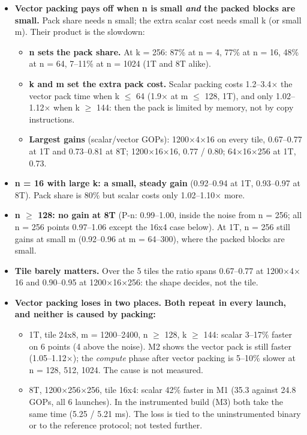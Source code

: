 \documentclass[10pt,a4paper]{article}
\begin{document}
\begin{itemize}\setlength\itemsep{2pt}
\item \textbf{Vector packing pays off when n is small \emph{and} the packed blocks are small.} Pack share needs n small;
the extra scalar cost needs small k (or small m). Their product is the slowdown:
  \begin{itemize}\setlength\itemsep{1pt}
  \item \textbf{n sets the pack share.} At k = 256: 87\% at n = 4, 77\% at n = 16, 48\% at n = 64, 7--11\% at n = 1024 (1T and 8T alike).
  \item \textbf{k and m set the extra pack cost.} Scalar packing costs 1.2--3.4$\times$ the vector pack time when k $\le$ 64
  (1.9$\times$ at m $\le$ 128, 1T), and only 1.02--1.12$\times$ when k $\ge$ 144: then the pack is limited by memory, not by
  copy instructions.
  \item \textbf{Largest gains} (scalar/vector GOPs): 1200$\times$4$\times$16 on every tile, 0.67--0.77 at 1T and 0.73--0.81 at 8T;
  1200$\times$16$\times$16, 0.77 / 0.80; 64$\times$16$\times$256 at 1T, 0.73.
  \end{itemize}
\item \textbf{n = 16 with large k: a small, steady gain} (0.92--0.94 at 1T, 0.93--0.97 at 8T). Pack share is 80\% but scalar costs only 1.02--1.10$\times$ more.
\item \textbf{n $\ge$ 128: no gain at 8T} (P-n: 0.99--1.00, inside the noise from n = 256; all n = 256 points 0.97--1.06 except the 16x4 case below). At 1T, n = 256 still gains at small m (0.92--0.96 at m = 64--300), where the packed blocks are small.
\item \textbf{Tile barely matters.} Over the 5 tiles the ratio spans 0.67--0.77 at 1200$\times$4$\times$16 and 0.90--0.95 at 1200$\times$16$\times$256: the shape decides, not the tile.
\item \textbf{Vector packing loses in two places. Both repeat in every launch, and neither is caused by packing:}
  \begin{itemize}\setlength\itemsep{1pt}
  \item 1T, tile 24x8, m = 1200--2400, n $\ge$ 128, k $\ge$ 144: scalar 3--17\% faster on 6 points (4 above the noise). M2 shows the vector pack is still faster (1.05--1.12$\times$); the \emph{compute} phase after vector packing is 5--10\% slower at n = 128, 512, 1024. The cause is not measured.
  \item 8T, 1200$\times$256$\times$256, tile 16x4: scalar 42\% faster in M1 (35.3 against 24.8 GOPs, all 6 launches). In the instrumented build (M3) both take the same time (5.25 / 5.21 ms). The loss is tied to the uninstrumented binary or to the reference protocol; not tested further.

\end{itemize}
\end{itemize}
\end{document}
